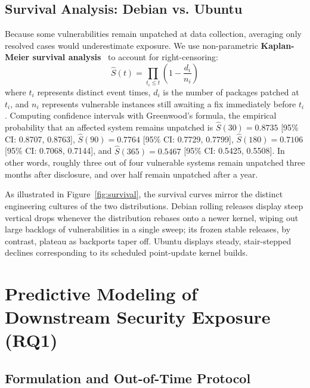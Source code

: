 \documentclass[graybox]{svmult}
\begin{document}
\subsection{Survival Analysis: Debian vs. Ubuntu}

Because some vulnerabilities remain unpatched at data collection, averaging only resolved cases would underestimate exposure. We use non-parametric \textbf{Kaplan-Meier survival analysis}~\cite{kaplan1958nonparametric} to account for right-censoring:
\begin{equation}
\hat{S}(t) = \prod_{t_i \le t} \left(1 - \frac{d_i}{n_i}\right)
\end{equation}
where $t_i$ represents distinct event times, $d_i$ is the number of packages patched at $t_i$, and $n_i$ represents vulnerable instances still awaiting a fix immediately before $t_i$. Computing confidence intervals with Greenwood's formula, the empirical probability that an affected system remains unpatched is $\hat{S}(30) = 0.8735$ [95\% CI: 0.8707, 0.8763], $\hat{S}(90) = 0.7764$ [95\% CI: 0.7729, 0.7799], $\hat{S}(180) = 0.7106$ [95\% CI: 0.7068, 0.7144], and $\hat{S}(365) = 0.5467$ [95\% CI: 0.5425, 0.5508]. In other words, roughly three out of four vulnerable systems remain unpatched three months after disclosure, and over half remain unpatched after a year.

As illustrated in Figure~\ref{fig:survival}, the survival curves mirror the distinct engineering cultures of the two distributions. Debian rolling releases display steep vertical drops whenever the distribution rebases onto a newer kernel, wiping out large backlogs of vulnerabilities in a single sweep; its frozen stable releases, by contrast, plateau as backports taper off. Ubuntu displays steady, stair-stepped declines corresponding to its scheduled point-update kernel builds.

\section{Predictive Modeling of Downstream Security Exposure (RQ1)}
\label{sec:modeling}

\subsection{Formulation and Out-of-Time Protocol}
\end{document}
